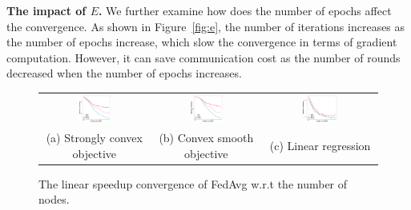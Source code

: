 \textbf{The impact of $E$.} We further examine how does the number of epochs 
affect the convergence. As shown in Figure~\ref{fig:e}, the number of iterations
increases as the number of epochs increase, which slow the convergence in
terms of gradient computation. However, it can save communication cost as
the number of rounds decreased when the number of epochs increases.


\begin{figure}
\centering
	\begin{tabular}{ccc}
	\hspace{-2em}\includegraphics[width=0.33\textwidth]{fig/paper-stronglycvxsmthspeedupNodesT-min-w8a-epsilon0131-reg1e-05.pdf} &
\includegraphics[width=0.33\textwidth]{fig/paper-cvxsmoothspeedupNodesT-min-w8a-epsilon0134-reg0.pdf} &
\includegraphics[width=0.33\textwidth]{fig/paper-linregressionspeedupNodesT-min-linearregressionw8a-epsilon002-reg0.pdf}\\
(a) Strongly convex objective & (b) Convex smooth objective & (c) Linear regression
	\end{tabular}
\caption{The linear speedup convergence of FedAvg w.r.t the number of nodes. }
\label{fig:speedup}
\end{figure}

